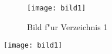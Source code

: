 \documentclass[12pt,oneside]{scrbook}
\begin{document}
\begin{figure}[!ht]
\centering\texttt{[image: bild1]}\caption{Bild f"ur Verzeichnis 1}
\end{figure}

\begin{figureA}[!ht]
\centering\texttt{[image: bild1]}\caption{Bild f"ur Verzeichnis 2}
\end{figureA}

\newpage
\listoffigures

\newpage
\listoffigureAs
\end{document}
